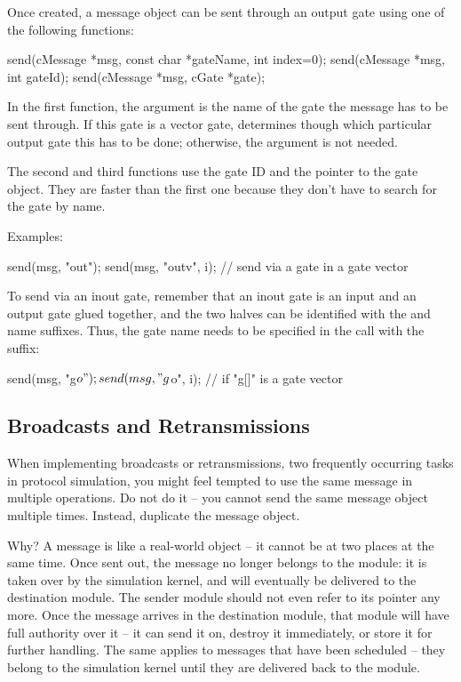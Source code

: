 Once created, a message object can be sent through an
output gate using one of the following functions:

\begin{cpp}
send(cMessage *msg, const char *gateName, int index=0);
send(cMessage *msg, int gateId);
send(cMessage *msg, cGate *gate);
\end{cpp}

In the first function, the argument  is the name of
the gate the message has to be sent through. If this gate is
a vector gate,  determines though which particular output
gate this has to be done; otherwise, the  argument is not
needed.

The second and third functions use the gate ID and the pointer to the gate
object. They are faster than the first one because they don't have to
search for the gate by name.

Examples:

\begin{cpp}
send(msg, "out");
send(msg, "outv", i); // send via a gate in a gate vector
\end{cpp}

To send via an inout gate, remember that an inout gate is an input and an
output gate glued together, and the two halves can be identified with the
 and  name suffixes. Thus, the gate name needs to be
specified in the  call with the  suffix:

\begin{cpp}
send(msg, "g$o");
send(msg, "g$o", i); // if "g[]" is a gate vector
\end{cpp}


\subsection{Broadcasts and Retransmissions}
\label{sec:simple-modules:broadcasts-and-retransmissions}

When implementing broadcasts or retransmissions, two frequently
occurring tasks in protocol simulation, you might feel tempted
to use the same message in multiple  operations.
Do not do it -- you cannot send the same message object multiple times.
Instead, duplicate the message object.

Why? A message is like a real-world object -- it cannot be at two places
at the same time. Once sent out, the message no longer belongs
to the module: it is taken over by the simulation kernel, and will
eventually be delivered to the destination module. The sender module should
not even refer to its pointer any more. Once the message arrives in the
destination module, that module will have full authority over it -- it can
send it on, destroy it immediately, or store it for further handling. The
same applies to messages that have been scheduled -- they belong to the
simulation kernel until they are delivered back to the module.

